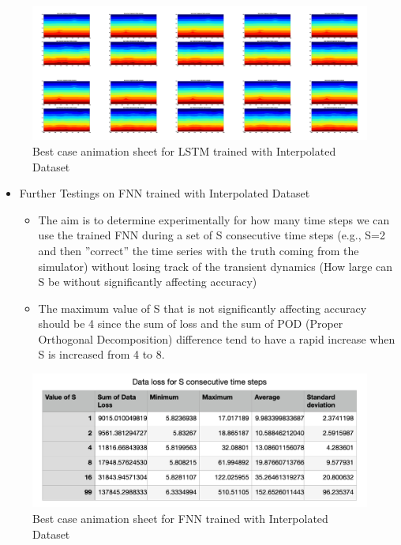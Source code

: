 {\begin{figure}[H]
        \includegraphics[width=\linewidth]{figures/LSTM_Best_GIF_sheet.png}
        \caption{Best case animation sheet for LSTM trained with Interpolated Dataset}
\end{figure}

\begin{itemize}
    \item Further Testings on FNN trained with Interpolated Dataset
        \begin{itemize}
            \item The aim is to determine experimentally for how many time steps we can use the trained FNN during a set of S consecutive time steps (e.g., S=2 and then ”correct” the time series with the truth coming from the simulator) without losing track of the transient dynamics (How large can S be without significantly affecting accuracy)

            \item The maximum value of S that is not significantly affecting accuracy should be 4 since the sum of loss and the sum of POD (Proper Orthogonal Decomposition) difference tend to have a rapid increase when S is increased from 4 to 8.
        \end{itemize}          
\end{itemize}

\begin{figure}[H]
    \includegraphics[width=\linewidth]{figures/Data_Loss_table.png}
    \caption{Best case animation sheet for FNN trained with Interpolated Dataset}
\end{figure}

}
